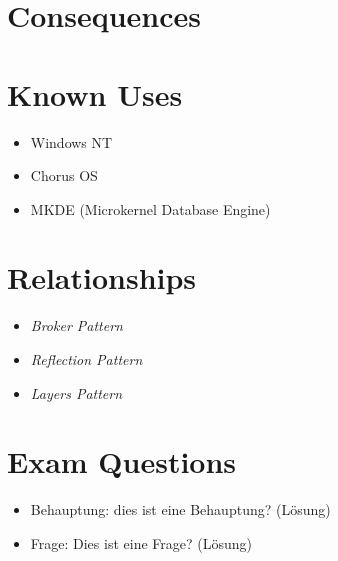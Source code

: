 \section{Consequences}
\begin{itemize}
\end{itemize}

\section{Known Uses}
\begin{itemize}
	\item Windows NT
	\item Chorus OS
	\item MKDE (Microkernel Database Engine)
\end{itemize}

\section{Relationships}
\begin{itemize}
	\item \textit{Broker Pattern}
	\item \textit{Reflection Pattern} 
	\item \textit{Layers Pattern}
\end{itemize}

\section{Exam Questions}
\begin{itemize}
  \item Behauptung: dies ist eine Behauptung? (Lösung)
    \item Frage: Dies ist eine Frage? (Lösung)
\end{itemize}
